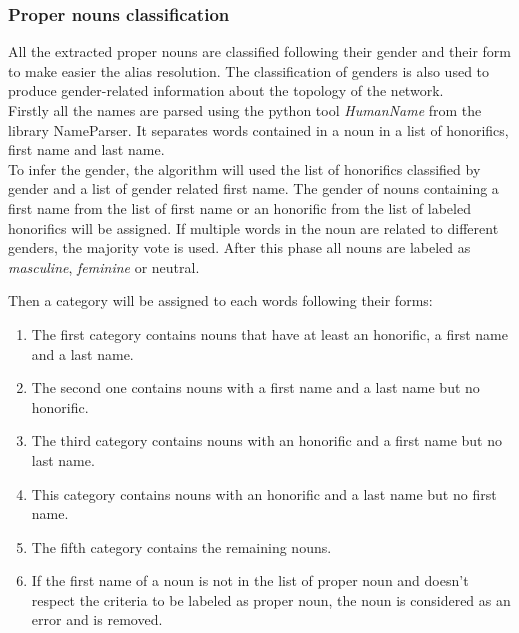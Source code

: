 \documentclass[a4paper, 12pt]{report}
\begin{document}
\subsubsection{Proper nouns classification}
All the extracted proper nouns are classified following their gender and their form to make easier the alias resolution. The classification of genders is also used to produce gender-related information about the topology of the network.\\
Firstly all the names are parsed using the python tool \textit{HumanName} from the library {NameParser}. It separates words contained in a noun in a list of honorifics, first name and last name.\\

To infer the gender, the algorithm will used the list of honorifics classified by gender and a list of gender related first name. The gender of nouns containing a first name from the list of first name or an honorific from the list of  labeled honorifics will be assigned. If multiple words in the noun are related to different genders, the majority vote is used. After this phase all nouns are labeled as \textit{masculine}, \textit{feminine} or {neutral}.

Then a category will be assigned to each words following their forms:
\begin{enumerate}
	\item The first category contains nouns that have at least an honorific, a first name and a last name.
	\item The second one contains nouns with a first name and a last name but no honorific.
	\item The third category contains nouns with an honorific and a first name but no last name.
	\item This category contains nouns with an honorific and a last name but no first name.
	\item The fifth category contains the remaining nouns.
	 \item If the first name of a noun is not in the list of proper noun and doesn't respect the criteria to be labeled as proper noun, the noun is considered as an error and is removed.
\end{enumerate}
\end{document}
